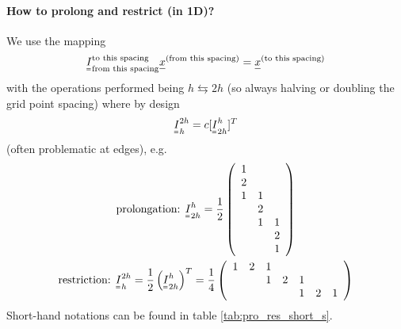 \paragraph*{How to prolong and restrict (in 1D)?} We use the mapping
\begin{equation}
    \mat{I}_{\text{from this spacing}}^{\text{to this spacing}} \vec{x}^{(\text{from this spacing})} = \vec{x}^{(\text{to this spacing})}
\end{equation}
with the operations performed being $h \leftrightarrows 2h$ (so always
halving or doubling the grid point spacing) where by design
\begin{equation}
    \mat{I}_h^{2h} = c[\mat{I}_{2h}^{h}]^T
\end{equation}
(often problematic at edges), e.g.
\begin{equation}
    \begin{gathered}
        \text{prolongation: } \mat{I}_{2h}^{h} = \frac{1}{2}\left(\begin{array}{lll}
            1 & & \\
            2 & & \\
            1 & 1 & \\
            & 2 & \\
            & 1 & 1 \\
            & & 2 \\
            & & 1
            \end{array}\right) \\ \text{restriction: } \mat{I}_{h}^{2h} = \frac{1}{2} \left( \mat{I}_{2h}^{h} \right)^T = \frac{1}{4} \left(\begin{array}{lllllll}
                1 & 2 & 1 & & & & \\
                & & 1 & 2 & 1 & & \\
                & & & & 1 & 2 & 1
                \end{array}\right)
    \end{gathered}
\end{equation}
Short-hand notations can be found in table \ref{tab:pro_res_short_s}.

